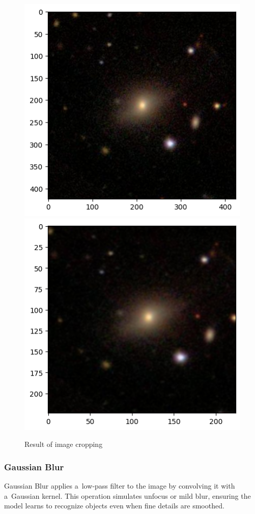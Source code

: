 \begin{figure}[htbp]\centering
  \centering
  \includegraphics[width=0.5\linewidth]{obrazky-figures/03-dataset/orig.png}\hfill
  \includegraphics[width=0.5\linewidth]{obrazky-figures/03-dataset/crop.png}
  \caption{Result of image cropping}
  \label{fig:dataset-crop}
\end{figure}

\subsubsection*{Gaussian Blur}

Gaussian Blur applies a~low‐pass filter to the image by convolving it with a~Gaussian kernel. This operation simulates unfocus or mild blur, ensuring the model learns to recognize objects even when fine details are smoothed.

